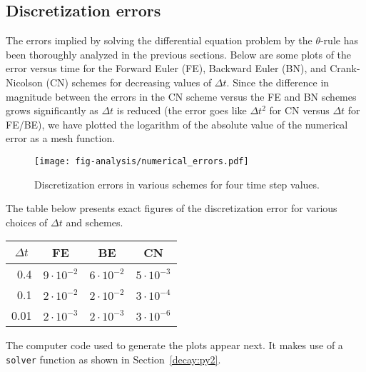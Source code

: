 \documentclass[graybox,sectrefs,envcountresetchap,open=right,final]{svmonodo}
\begin{document}
\subsection{Discretization errors}

The errors implied by solving the differential equation problem by
the $\theta$-rule has been thoroughly analyzed in the previous
sections. Below are some plots of the error versus time for the
Forward Euler (FE), Backward Euler (BN), and Crank-Nicolson (CN)
schemes for decreasing values of $\Delta t$. Since the difference
in magnitude between the errors in the CN scheme versus the FE and
BN schemes grows significantly as $\Delta t$ is reduced (the error
goes like $\Delta t^2$ for CN versus $\Delta t$ for FE/BE), we have
plotted the logarithm of the absolute value of the numerical error
as a mesh function.


\begin{figure}[!ht]  %
  \centerline{\texttt{[image: fig-analysis/numerical\_errors.pdf]}}
  \caption{
  Discretization errors in various schemes for four time step values. \label{decay:analysis:numerical_errors:fig}
  }
\end{figure}


The table below presents exact figures of the discretization error
for various choices of $\Delta t$ and schemes.



{\small   %

\vspace{4mm}

\begin{tabular}{rrrr}
\hline
\multicolumn{1}{c}{ $\Delta t$ } & \multicolumn{1}{c}{ FE } & \multicolumn{1}{c}{ BE } & \multicolumn{1}{c}{ CN } \\
\hline
0.4        & $9\cdot 10^{-2}$ & $6\cdot 10^{-2}$ & $ 5\cdot 10^{-3}$ \\
0.1        & $2\cdot 10^{-2}$ & $2\cdot 10^{-2}$ & $ 3\cdot 10^{-4}$ \\
0.01       & $2\cdot 10^{-3}$ & $2\cdot 10^{-3}$ & $ 3\cdot 10^{-6}$ \\
\hline
\end{tabular}

\vspace{4mm}

}


\noindent
The computer code used to generate the plots appear next. It makes use
of a \texttt{solver} function
as shown in Section~\ref{decay:py2}.
\end{document}
